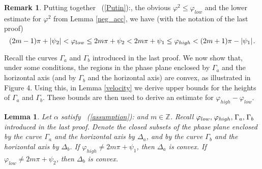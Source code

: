 \documentclass[12pt]{article}
\newtheorem{lemma}[theorem]{Lemma}
\theoremstyle{definition}
\newtheorem{remark}[theorem]{Remark}
\numberwithin{equation}{section}                        %
\newcommand{\rfb}[1]{\mbox{\rm
   (\ref{#1})}\ifx\undefined\stillediting\else:\fbox{$#1$}\fi}
\newcommand{\zline}  {{\mathbb Z}}
\newcommand{\m}      {{\hbox{\hskip 1pt}}}
\newcommand{\vp}     {{\varphi}}
\let\oldlabel=\label
\renewcommand{\label}[1]{\leavevmode\smash{\raise 10pt\llap
             {\fbox{\scriptsize#1}}}\oldlabel{#1}}
\renewcommand{\label}[1]{\oldlabel{#1}}
\begin{document}
\begin{remark}
Putting together \rfb{Putin}, the obvious $\varphi^2\leq\vp_{low}$
and the lower estimate for $\vp^2$ from Lemma \ref{neg_acc}, we have
(with the notation of the last proof) \vspace{-2mm}
$$ (2m-1)\pi+|\psi_2|<\vp_{low}\leq2m\pi+\psi_2<2m\pi+\psi_1\leq
   \vp_{high}<(2m+1)\pi-|\psi_1| \m.\vspace{-2mm}$$
\end{remark}

Recall the curves $\Gamma_a$ and $\Gamma_b$ introduced in the last
proof. We now show that, under some conditions, the regions in the
phase plane enclosed by $\Gamma_a$ and the horizontal axis (and by
$\Gamma_b$ and the horizontal axis) are convex, as illustrated in
Figure 4. Using this, in Lemma \ref{velocity} we derive upper bounds
for the heights of $\Gamma_a$ and $\Gamma_b$. These bounds are then
used to derive an estimate for $\varphi_{high}-\varphi_{low}$.

\begin{lemma} \label{convexity}
Let $\alpha$ satisfy \rfb{assumption} and $m\in\zline$. Recall
$\varphi_{low},\m\varphi_{high},\m\Gamma_a,\m\Gamma_b$ introduced in
the last proof. Denote the closed subsets of the phase plane enclosed
by the curve $\Gamma_a$ and the horizontal axis by $\Delta_a$, and by
the curve $\Gamma_b$ and the horizontal axis by $\Delta_b$. If
$\varphi_{high}\neq 2m\pi+\psi_1$, then $\Delta_a$ is convex. If
$\varphi_{low}\neq 2m\pi+\psi_2$, then $\Delta_b$ is convex.
\vspace{-7mm} \m
\end{lemma}
\end{document}
